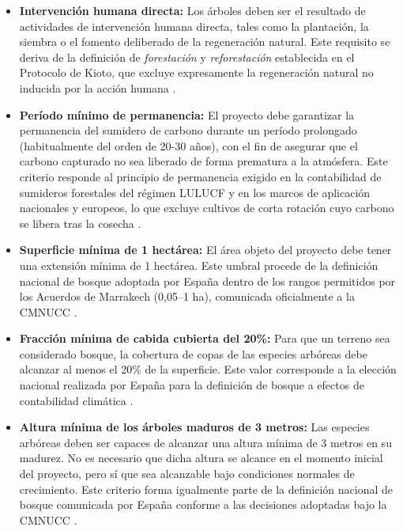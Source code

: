 \begin{itemize}
\item \textbf{Intervención humana directa:}
Los árboles deben ser el resultado de actividades de intervención humana directa, tales como la plantación, la siembra o el fomento deliberado de la regeneración natural. Este requisito se deriva de la definición de \emph{forestación} y \emph{reforestación} establecida en el Protocolo de Kioto, que excluye expresamente la regeneración natural no inducida por la acción humana \cite{UNFCCCMarrakech}.

\item \textbf{Período mínimo de permanencia:}
El proyecto debe garantizar la permanencia del sumidero de carbono durante un período prolongado (habitualmente del orden de 20-30 años), con el fin de asegurar que el carbono capturado no sea liberado de forma prematura a la atmósfera. Este criterio responde al principio de permanencia exigido en la contabilidad de sumideros forestales del régimen LULUCF y en los marcos de aplicación nacionales y europeos, lo que excluye cultivos de corta rotación cuyo carbono se libera tras la cosecha \cite{UNFCCCMarrakech,EULULUCF2018}.

\item \textbf{Superficie mínima de 1 hectárea:}
El área objeto del proyecto debe tener una extensión mínima de 1 hectárea. Este umbral procede de la definición nacional de bosque adoptada por España dentro de los rangos permitidos por los Acuerdos de Marrakech (0,05–1 ha), comunicada oficialmente a la CMNUCC \cite{UNFCCCSpainReview}.

\item \textbf{Fracción mínima de cabida cubierta del 20\%:}
Para que un terreno sea considerado bosque, la cobertura de copas de las especies arbóreas debe alcanzar al menos el 20\% de la superficie. Este valor corresponde a la elección nacional realizada por España para la definición de bosque a efectos de contabilidad climática \cite{UNFCCCSpainReview}.

\item \textbf{Altura mínima de los árboles maduros de 3 metros:}
Las especies arbóreas deben ser capaces de alcanzar una altura mínima de 3 metros en su madurez. No es necesario que dicha altura se alcance en el momento inicial del proyecto, pero sí que sea alcanzable bajo condiciones normales de crecimiento. Este criterio forma igualmente parte de la definición nacional de bosque comunicada por España conforme a las decisiones adoptadas bajo la CMNUCC \cite{UNFCCCSpainReview}.
\end{itemize}


